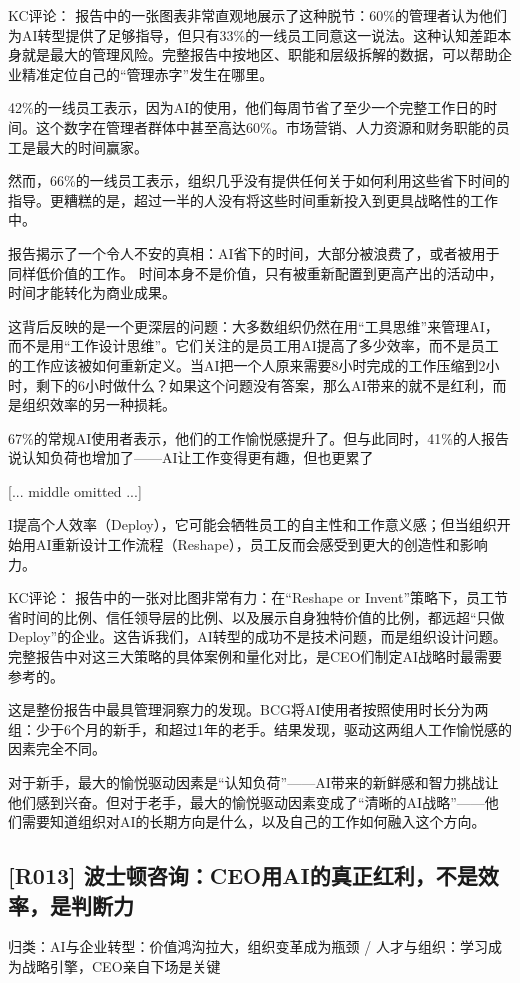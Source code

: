 \documentclass[11pt]{ctexart}
\begin{document}
KC评论： 报告中的一张图表非常直观地展示了这种脱节：60\%的管理者认为他们为AI转型提供了足够指导，但只有33\%的一线员工同意这一说法。这种认知差距本身就是最大的管理风险。完整报告中按地区、职能和层级拆解的数据，可以帮助企业精准定位自己的“管理赤字”发生在哪里。

42\%的一线员工表示，因为AI的使用，他们每周节省了至少一个完整工作日的时间。这个数字在管理者群体中甚至高达60\%。市场营销、人力资源和财务职能的员工是最大的时间赢家。

然而，66\%的一线员工表示，组织几乎没有提供任何关于如何利用这些省下时间的指导。更糟糕的是，超过一半的人没有将这些时间重新投入到更具战略性的工作中。

报告揭示了一个令人不安的真相：AI省下的时间，大部分被浪费了，或者被用于同样低价值的工作。 时间本身不是价值，只有被重新配置到更高产出的活动中，时间才能转化为商业成果。

这背后反映的是一个更深层的问题：大多数组织仍然在用“工具思维”来管理AI，而不是用“工作设计思维”。它们关注的是员工用AI提高了多少效率，而不是员工的工作应该被如何重新定义。当AI把一个人原来需要8小时完成的工作压缩到2小时，剩下的6小时做什么？如果这个问题没有答案，那么AI带来的就不是红利，而是组织效率的另一种损耗。

67\%的常规AI使用者表示，他们的工作愉悦感提升了。但与此同时，41\%的人报告说认知负荷也增加了——AI让工作变得更有趣，但也更累了

[... middle omitted ...]

I提高个人效率（Deploy），它可能会牺牲员工的自主性和工作意义感；但当组织开始用AI重新设计工作流程（Reshape），员工反而会感受到更大的创造性和影响力。

KC评论： 报告中的一张对比图非常有力：在“Reshape or Invent”策略下，员工节省时间的比例、信任领导层的比例、以及展示自身独特价值的比例，都远超“只做Deploy”的企业。这告诉我们，AI转型的成功不是技术问题，而是组织设计问题。完整报告中对这三大策略的具体案例和量化对比，是CEO们制定AI战略时最需要参考的。

这是整份报告中最具管理洞察力的发现。BCG将AI使用者按照使用时长分为两组：少于6个月的新手，和超过1年的老手。结果发现，驱动这两组人工作愉悦感的因素完全不同。

对于新手，最大的愉悦驱动因素是“认知负荷”——AI带来的新鲜感和智力挑战让他们感到兴奋。但对于老手，最大的愉悦驱动因素变成了“清晰的AI战略”——他们需要知道组织对AI的长期方向是什么，以及自己的工作如何融入这个方向。

\subsection{[R013] 波士顿咨询：CEO用AI的真正红利，不是效率，是判断力}
{\small\color{refgray}归类：AI与企业转型：价值鸿沟拉大，组织变革成为瓶颈 / 人才与组织：学习成为战略引擎，CEO亲自下场是关键}
\end{document}
